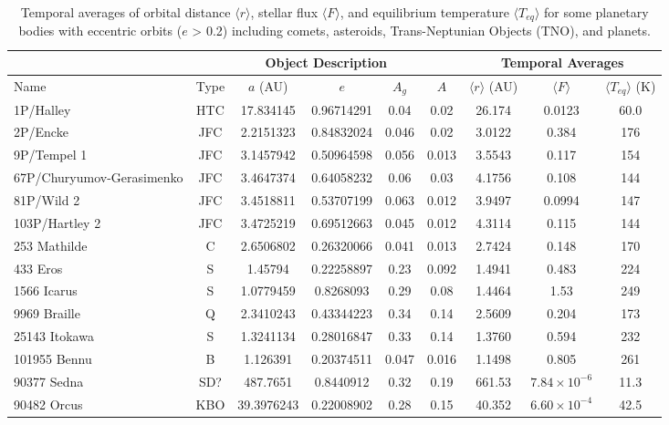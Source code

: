 \documentclass[a4paper,fleqn,usenatbib]{mnras}
\begin{document}

\begin{table}
\begin{threeparttable}
\centering
\caption{Temporal averages of orbital distance $\langle r \rangle$, stellar flux $\langle F \rangle$, and equilibrium temperature $\langle T_{eq} \rangle$ for some  planetary bodies with eccentric orbits ($e$ > 0.2) including comets, asteroids, Trans-Neptunian Objects (TNO), and planets.}
\begin{tabular}{ l c c c c c c c c }
 \hline
 \hline
 & \multicolumn{5}{c}{Object Description\tnote{a}} & \multicolumn{3}{c}{Temporal Averages\tnote{d}} \\
 \hline
 Name & Type & $a$ (AU) & $e$ & $A_g$\tnote{b} & $A$\tnote{c} & $\langle r \rangle$ (AU) & $\langle F \rangle$ & $\langle T_{eq} \rangle$ (K) \\ 
 \hline
 1P/Halley & HTC & 17.834145 & 0.96714291 & 0.04 & 0.02 & 26.174  & 0.0123 & 60.0 \\  
 2P/Encke & JFC & 2.2151323 & 0.84832024 & 0.046 & 0.02 & 3.0122 & 0.384 & 176 \\
 9P/Tempel 1 & JFC & 3.1457942 & 0.50964598 & 0.056 & 0.013 & 3.5543 & 0.117 & 154 \\
 67P/Churyumov-Gerasimenko & JFC & 3.4647374 & 0.64058232 & 0.06 & 0.03 & 4.1756  & 0.108 & 144 \\
 81P/Wild 2 & JFC & 3.4518811 & 0.53707199 & 0.063 & 0.012 & 3.9497 & 0.0994 & 147 \\ 
 103P/Hartley 2 & JFC & 3.4725219 & 0.69512663 & 0.045 & 0.012 & 4.3114 & 0.115 & 144 \\
 253 Mathilde & C & 2.6506802 & 0.26320066 & 0.041 & 0.013 & 2.7424 & 0.148 & 170 \\
 433 Eros & S & 1.45794 & 0.22258897 & 0.23 & 0.092 & 1.4941 & 0.483 & 224 \\
 1566 Icarus & S & 1.0779459 & 0.8268093 & 0.29 & 0.08 & 1.4464  & 1.53 & 249 \\
 9969 Braille & Q & 2.3410243 & 0.43344223 & 0.34 & 0.14 & 2.5609 & 0.204 & 173 \\
 25143 Itokawa & S & 1.3241134 & 0.28016847 & 0.33 & 0.14 & 1.3760 & 0.594 & 232 \\
 101955	Bennu & B & 1.126391 & 0.20374511 & 0.047 & 0.016   & 1.1498 & 0.805 & 261 \\
 90377 Sedna & SD? & 487.7651 & 0.8440912 & 0.32 & 0.19 & 661.53  & $7.84\times10^{-6}$ & 11.3 \\
 90482 Orcus & KBO & 39.3976243 & 0.22008902 & 0.28 & 0.15 & 40.352 & $6.60\times10^{-4}$ & 42.5 \\

\end{tabular}
\end{threeparttable}
\end{table}
\end{document}
